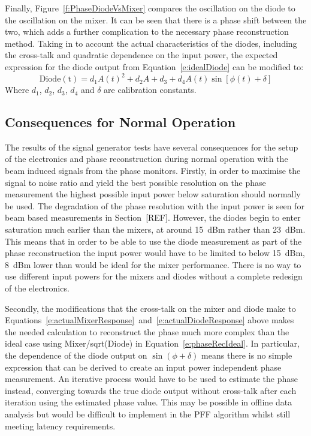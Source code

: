 Finally, Figure~\ref{f:PhaseDiodeVsMixer} compares the oscillation on the diode to the oscillation on the mixer. It can be seen that there is a phase shift between the two, which adds a further complication to the necessary phase reconstruction method. Taking in to account the actual characteristics of the diodes, including the cross-talk and quadratic dependence on the input power, the expected expression for the diode output from Equation~\ref{e:idealDiode} can be modified to:
\begin{equation}
\mathrm{Diode(t)} = d_1A(t)^2 + d_2A + d_3 + d_4A(t)\sin[\phi(t)+\delta]
\label{e:actualDiodeResponse}
\end{equation}
Where \(d_1\), \(d_2\), \(d_3\), \(d_4\) and \(\delta\) are calibration constants.



\subsection{Consequences for Normal Operation}
\label{ss:sigGenConsq}

The results of the signal generator tests have several consequences for the setup of the electronics and phase reconstruction during normal operation with the beam induced signals from the phase monitors. Firstly, in order to maximise the signal to noise ratio and yield the best possible resolution on the phase measurement the highest possible input power below saturation should normally be used. The degradation of the phase resolution with the input power is seen for beam based measurements in Section~[REF]. However, the diodes begin to enter saturation much earlier than the mixers, at around 15~dBm rather than 23~dBm. This means that in order to be able to use the diode measurement as part of the phase reconstruction the input power would have to be limited to below 15~dBm, 8~dBm lower than would be ideal for the mixer performance. There is no way to use different input powers for the mixers and diodes without a complete redesign of the electronics.

Secondly, the modifications that the cross-talk on the mixer and diode make to Equations~\ref{e:actualMixerResponse}~and~\ref{e:actualDiodeResponse} above makes the needed calculation to reconstruct the phase much more complex than the ideal case using Mixer/sqrt(Diode) in Equation~\ref{e:phaseRecIdeal}. In particular, the dependence of the diode output on \(\sin(\phi+\delta)\) means there is no simple expression that can be derived to create an input power independent phase measurement. An iterative process would have to be used to estimate the phase instead, converging towards the true diode output without cross-talk after each iteration using the estimated phase value. This may be possible in offline data analysis but would be difficult to implement in the PFF algorithm whilst still meeting latency requirements.

